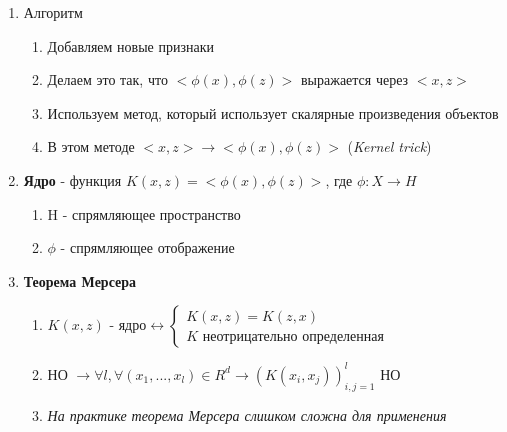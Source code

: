 \documentclass[a4paper, 12pt]{article}
\begin{document}
\begin{enumerate}
    \item Алгоритм
    \begin{enumerate}
        \item Добавляем новые признаки
        \item Делаем это так, что $<\phi(x), \phi(z)>$ выражается через $<x, z>$
        \item Используем метод, который использует скалярные произведения объектов
        \item В этом методе $<x, z> \rightarrow <\phi(x), \phi(z)>$ (\textit{Kernel trick})
    \end{enumerate}
    \item \textbf{Ядро} - функция $K(x, z) = <\phi(x), \phi(z)>$, где $\phi: X \to H$
    \begin{enumerate}
        \item H - спрямляющее пространство
        \item $\phi$ - спрямляющее отображение
    \end{enumerate}
    
    \item \textbf{Теорема Мерсера}
    \begin{enumerate}
        \item $K(x, z) \text{ - ядро} \leftrightarrow \begin{cases}
        K(x, z) = K(z, x) \\ K \text{ неотрицательно определенная}
        \end{cases}$
        \item НО $ \rightarrow \forall l, \forall (x_{1}, ..., x_{l}) \in R^{d} \rightarrow (K(x_{i}, x_{j}))^{l}_{i, j = 1} \text{ НО}$
        \item \textit{На практике теорема Мерсера слишком сложна для применения}
    \end{enumerate}
    

\end{enumerate}
\end{document}
